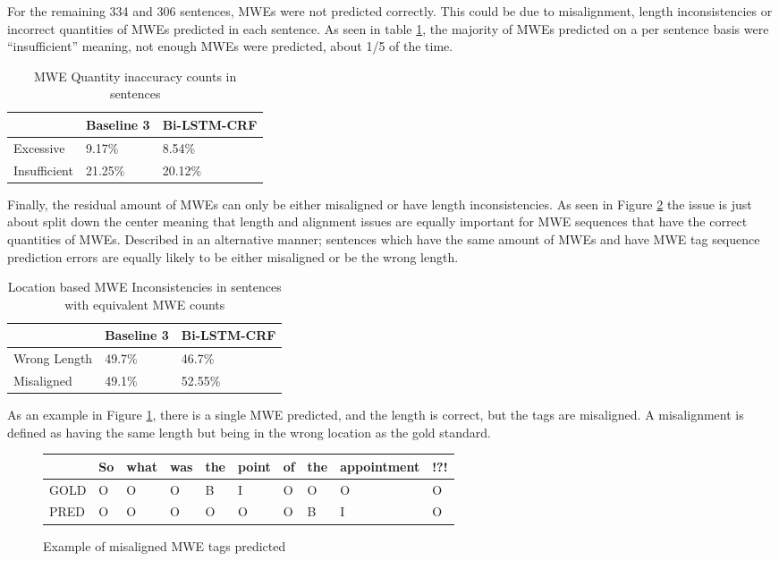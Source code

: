 For the remaining 334 and 306 sentences, MWEs were not predicted correctly. This could be due to misalignment, length inconsistencies or incorrect quantities of MWEs predicted in each sentence. As seen in table \ref{tab:mwetagseqinacccounts}, the majority of MWEs predicted on a per sentence basis were ``insufficient'' meaning, not enough MWEs were predicted, about 1/5 of the time. 

\begin{table}[H]
    \centering
    \begin{tabular}{l|l|l}
      & Baseline 3 & Bi-LSTM-CRF\\
      \hline
      Excessive & 9.17\% & 8.54\%\\
      Insufficient & 21.25\% & 20.12\%\\
    \end{tabular}
  \caption{MWE Quantity inaccuracy counts in sentences}
  \label{tab:mwetagseqinacccounts}
\end{table}

Finally, the residual amount of MWEs can only be either misaligned or have length inconsistencies. As seen in Figure \ref{tab:mwelengthalignmentinconsistencies} the issue is just about split down the center meaning that length and alignment issues are equally important for MWE sequences that have the correct quantities of MWEs. Described in an alternative manner; sentences which have the same amount of MWEs and have MWE tag sequence prediction errors are equally likely to be either misaligned or be the wrong length.

\begin{table}[H]
    \centering
    \begin{tabular}{l|l|l}
      & Baseline 3 & Bi-LSTM-CRF\\
      \hline
      Wrong Length & 49.7\% & 46.7\%\\
      Misaligned & 49.1\% & 52.55\%\\
    \end{tabular}
  \caption{Location based MWE Inconsistencies in sentences with equivalent MWE counts}
  \label{tab:mwelengthalignmentinconsistencies}
\end{table}

As an example in Figure \ref{fig:misalignedmwepred}, there is a single MWE predicted, and the length is correct, but the tags are misaligned. A misalignment is defined as having the same length but being in the wrong location as the gold standard.

\begin{figure}[H]
    \centering
    \begin{tabular}{l|lllllllll}
           & So & what & was & the & point & of & the & appointment & !?!\\
      \hline
      \rowcolor{yellow!50}
      GOLD & O  & O    & O   & B   & I     & O  & O   & O           & O\\
      PRED & O  & O    & O   & O   & O     & O  & B   & I           & O\\
    \end{tabular}
  \caption{Example of misaligned MWE tags predicted}
  \label{fig:misalignedmwepred}
\end{figure}

